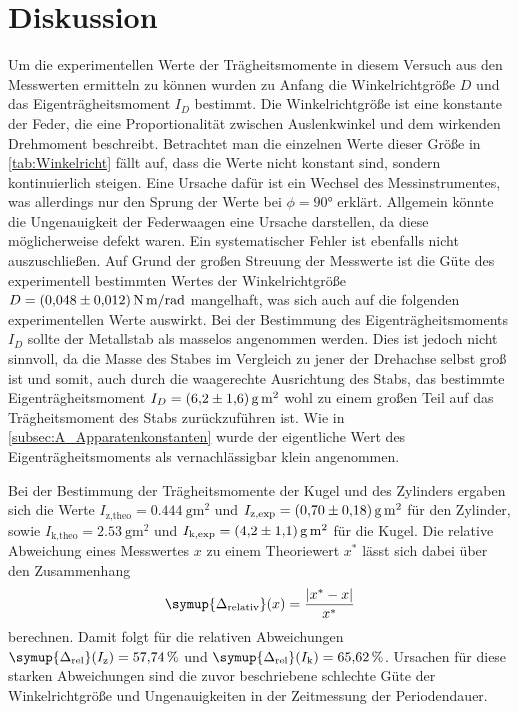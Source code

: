 \section{Diskussion}
\label{sec:Diskussion}
Um die experimentellen Werte der Trägheitsmomente in diesem Versuch aus den Messwerten ermitteln zu können wurden zu Anfang die Winkelrichtgröße $D$ und das Eigenträgheitsmoment
$I_D$ bestimmt. Die Winkelrichtgröße ist eine konstante der Feder, die eine Proportionalität zwischen Auslenkwinkel und dem wirkenden Drehmoment beschreibt. Betrachtet man die
einzelnen Werte dieser Größe in \autoref{tab:Winkelricht} fällt auf, dass die Werte nicht konstant sind, sondern kontinuierlich steigen. Eine Ursache dafür ist ein Wechsel des 
Messinstrumentes, was allerdings nur den Sprung der Werte bei $\phi = 90°$ erklärt. Allgemein könnte die Ungenauigkeit der Federwaagen eine Ursache darstellen, da diese 
möglicherweise defekt waren. Ein systematischer Fehler ist ebenfalls nicht auszuschließen. Auf Grund der großen Streuung der Messwerte ist die Güte des experimentell bestimmten 
Wertes der Winkelrichtgröße $D = \qty{0.048 +- 0.012}{\newton\metre\per\radian}$ mangelhaft, was sich auch auf die folgenden experimentellen Werte auswirkt. Bei der Bestimmung 
des Eigenträgheitsmoments $I_D$ sollte der Metallstab als masselos angenommen werden. Dies ist jedoch nicht sinnvoll, da die Masse des Stabes im Vergleich zu jener der Drehachse
selbst groß ist und somit, auch durch die waagerechte Ausrichtung des Stabs, das bestimmte Eigenträgheitsmoment $I_D = \qty{6.2 +- 1.6}{\gram\square\metre}$ wohl zu einem großen
Teil auf das Trägheitsmoment des Stabs zurückzuführen ist. Wie in \autoref{subsec:A_Apparatenkonstanten} wurde der eigentliche Wert des Eigenträgheitsmoments als vernachlässigbar
klein angenommen.

Bei der Bestimmung der Trägheitsmomente der Kugel und des Zylinders ergaben sich die Werte $I_{\text{z,theo}} = \qty{0.444}{\gram\metre\squared}$ und 
$I_{\text{z,exp}} = \qty{0.70+-0.18}{\gram\metre\squared}$ für den Zylinder, sowie $I_{\text{k,theo}} = \qty{2.53}{\gram\metre\squared}$ und 
$I_{\text{k,exp}} = \qty{4.2+-1.1}{\gram\metre\squared}$ für die Kugel. Die relative Abweichung eines Messwertes $x$ zu einem Theoriewert $x^*$ lässt sich dabei über den
Zusammenhang
\begin{equation}
    \label{eqn:rel_Abw}
    \symup{\Delta_\text{relativ}}(x) = \frac{|x^* - x|}{x^*}
\end{equation}
berechnen. Damit folgt für die relativen Abweichungen $\symup{\Delta_\text{rel}}(I_\text{z}) = \qty{57.74}{\percent}$ und 
$\symup{\Delta_\text{rel}}(I_\text{k}) = \qty{65.62}{\percent}$. Ursachen für diese starken Abweichungen sind die zuvor beschriebene schlechte Güte der Winkelrichtgröße und 
Ungenauigkeiten in der Zeitmessung der Periodendauer.

